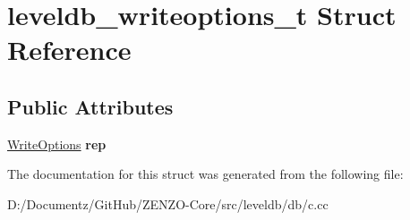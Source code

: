 \hypertarget{structleveldb__writeoptions__t}{}\section{leveldb\+\_\+writeoptions\+\_\+t Struct Reference}
\label{structleveldb__writeoptions__t}
\subsection*{Public Attributes}
\begin{DoxyCompactItemize}
\item 
\mbox{\label{structleveldb__writeoptions__t_ad51ccdc92007bd69dcb075bba4aef788}} 
\mbox{\hyperlink{structleveldb_1_1_write_options}{Write\+Options}} {\bfseries rep}
\end{DoxyCompactItemize}


The documentation for this struct was generated from the following file\+:\begin{DoxyCompactItemize}
\item 
D\+:/\+Documentz/\+Git\+Hub/\+Z\+E\+N\+Z\+O-\/\+Core/src/leveldb/db/c.\+cc\end{DoxyCompactItemize}
